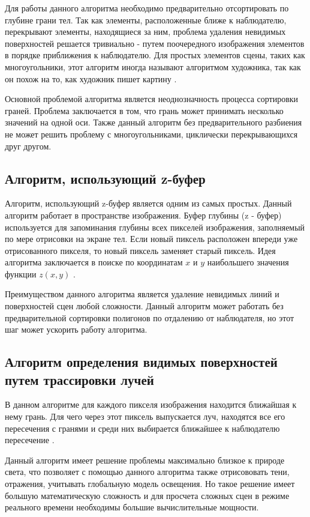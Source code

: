 Для работы данного алгоритма необходимо предварительно отсортировать по глубине грани тел. Так как элементы, расположенные ближе к наблюдателю, перекрывают элементы, находящиеся за ним, проблема удаления невидимых поверхностей решается тривиально - путем поочередного изображения элементов в порядке приближения к наблюдателю. Для простых элементов сцены, таких как многоугольники, этот алгоритм иногда называют алгоритмом художника, так как он похож на то, как художник пишет картину  \cite[с. 329]{Rogers89}.
\par
Основной проблемой алгоритма является неоднозначность процесса сортировки граней. Проблема заключается в том, что  грань может принимать несколько значений на одной оси. Также данный алгоритм без предварительного разбиения не может решить проблему с многоугольниками, циклически перекрывающихся друг другом.

\subsection{Алгоритм, использующий z-буфер}

Алгоритм, использующий z-буфер является одним из самых простых. Данный алгоритм работает в пространстве изображения. Буфер глубины (z - буфер) используется для запоминания глубины всех пикселей изображения, заполняемый по мере отрисовки на экране тел. Если новый пиксель расположен впереди уже отрисованного пикселя, то новый пиксель заменяет старый пиксель. Идея алгоритма заключается в поиске по координатам $x$ и $y$ наибольшего значения функции $z(x,y)$ \cite[с. 321]{Rogers89}.
\par
Преимуществом данного алгоритма является удаление невидимых линий и поверхностей сцен любой сложности. Данный алгоритм может работать без предварительной сортировки полигонов по отдалению от наблюдателя, но этот шаг может ускорить работу алгоритма. 

\subsection{Алгоритм определения видимых поверхностей путем трассировки лучей}

В данном алгоритме для каждого пикселя изображения находится ближайшая к нему грань. Для чего через этот пиксель выпускается луч, находятся все его пересечения с гранями и среди них выбирается ближайшее к наблюдателю пересечение  \cite[с. 360]{Rogers89}. 
\par
Данный алгоритм имеет решение проблемы максимально близкое к природе света, что позволяет с помощью данного алгоритма  также отрисововать тени, отражения, учитывать глобальную модель освещения. Но такое решение имеет большую математическую сложность и для просчета сложных сцен в режиме реального времени необходимы большие вычислительные мощности.  

